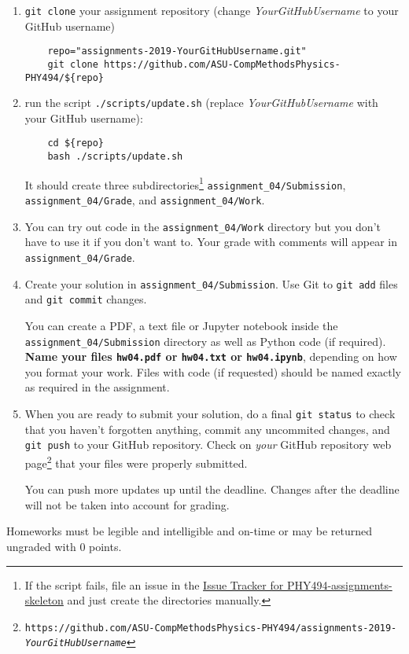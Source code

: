 \documentclass[letterpaper]{scrartcl}
\newcommand{\anumber}{4}
\newcommand{\anum}{0\anumber}
\begin{document}
\begin{enumerate}
\item \texttt{git clone} your assignment repository (change
  \emph{YourGitHubUsername} to your GitHub username)
  \begin{verbatim}
    repo="assignments-2019-YourGitHubUsername.git" 
    git clone https://github.com/ASU-CompMethodsPhysics-PHY494/${repo}
  \end{verbatim}
\item run the script
  \texttt{./scripts/update.sh} (replace \emph{YourGitHubUsername} with
  your GitHub username):
  \begin{verbatim}
    cd ${repo} 
    bash ./scripts/update.sh
  \end{verbatim}
  It should create three subdirectories\footnote{If the script fails,
    file an issue in the
    \href{https://github.com/ASU-CompMethodsPhysics-PHY494/PHY494-assignments-skeleton/issues}{Issue
      Tracker for PHY494-assignments-skeleton} and just create the
    directories manually.} \texttt{assignment\_\anum/Submission},
  \texttt{assignment\_\anum/Grade}, and
  \texttt{assignment\_\anum/Work}.
\item You can try out code in the \texttt{assignment\_\anum/Work}
  directory but you don't have to use it if you don't want to. Your
  grade with comments will appear in
  \texttt{assignment\_\anum/Grade}.
\item Create your solution in
  \texttt{assignment\_\anum/Submission}. Use Git to \texttt{git
    add} files and \texttt{git commit} changes.

  You can create a PDF, a text file or Jupyter notebook inside the
  \texttt{assignment\_\anum/Submission} directory as well as Python
  code (if required). \textbf{Name your files \texttt{hw\anum.pdf} or
    \texttt{hw\anum.txt} or \texttt{hw\anum.ipynb}}, depending on how
  you format your work. Files with code (if requested) should be named
  exactly as required in the assignment.
\item When you are ready to submit your solution, do a final
  \texttt{git status} to check that you haven't forgotten anything,
  commit any uncommited changes, and \texttt{git push} to your GitHub
  repository. Check on \emph{your} GitHub repository web
  page\footnote{\texttt{https://github.com/ASU-CompMethodsPhysics-PHY494/assignments-2019-\emph{YourGitHubUsername}}}
  that your files were properly submitted.

  You can push more updates up until the deadline. Changes after the
  deadline will not be taken into account for grading.
\end{enumerate}
Homeworks must be legible and intelligible and on-time or may  be
returned ungraded with 0 points.
\end{document}
